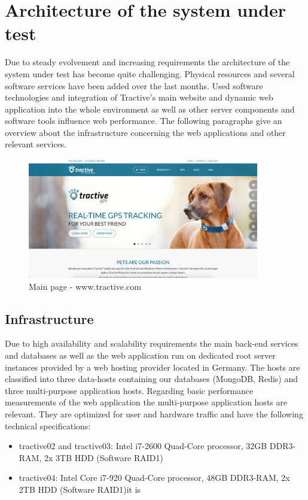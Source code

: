 \chapter{Architecture of the system under test}
\label{chap:architecture}

Due to steady evolvement and increasing requirements the architecture of the system under test has become quite challenging. Physical resources and several software services have been added over the last months. Used software technologies and integration of Tractive's main website and dynamic web application into the whole environment as well as other server components and software tools influence web performance. The following paragraphs give an overview about the infrastructure concerning the web applications and other relevant services.

\begin{figure}[h]
	\centering
		\includegraphics[width=0.9\textwidth]{imgs/tractive.png}
	\caption{Main page - www.tractive.com}
\end{figure}

\section{Infrastructure}
Due to high availability and scalability requirements the main back-end services and databases as well as the web application run on dedicated root server instances provided by a web hosting provider located in Germany. The hosts are classified into three data-hosts containing our databases (MongoDB, Redis) and three multi-purpose application hosts. Regarding basic performance measurements of the web application the multi-purpose application hosts are relevant. They are optimized for user and hardware traffic and have the following technical specifications:

\begin{itemize}
	\item{tractive02 and tractive03}: Intel i7-2600 Quad-Core processor, 32GB DDR3-RAM, 2x 3TB HDD (Software RAID1)
	\item{tractive04}: Intel Core i7-920 Quad-Core processor, 48GB DDR3-RAM, 2x 2TB HDD (Software RAID1)it is
\end{itemize}


